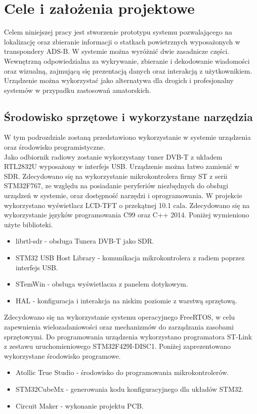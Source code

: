 \documentclass[eng,printmode]{mgr}
\begin{document}
\chapter{ Cele i założenia projektowe }
Celem niniejszej pracy jest stworzenie prototypu systemu pozwalającego na lokalizację oraz zbieranie informacji o  statkach powietrznych wyposażonych w transpondery ADS-B. W systemie można wyróżnić dwie zasadnicze części.
Wewnętrzną odpowiedzialna za wykrywanie, zbieranie i dekodowanie wiadomości oraz wizualną, zajmującą się prezentacją danych oraz interakcją z użytkownikiem. Urządzenie można wykorzystać jako alternatywa dla drogich i profesjonalny systemów w przypadku zastosowań amatorskich.

\section{Środowisko sprzętowe i wykorzystane narzędzia}
W tym podrozdziale zostaną przedstawiono wykorzystanie w systemie urządzenia oraz środowisko programistyczne.
\\
Jako odbiornik radiowy zostanie wykorzystany tuner DVB-T z układem RTL2832U wyposażony w interfejs USB. Urządzenie można łatwo zamienić w SDR. Zdecydowano się na wykorzystanie mikrokontrolera firmy ST z serii STM32F767, ze względu na posiadanie peryferiów niezbędnych do obsługi urządzeń w systemie, oraz dostępność narzędzi i oprogramowania. W projekcie wykorzystano wyświetlacz LCD-TFT o przekątnej 10.1 cala.
Zdecydowano się na wykorzystanie języków programowania C99 oraz C++ 2014.
Poniżej wymieniono użyte biblioteki.
\begin{itemize}
  \item librtl-sdr - obsługa Tunera DVB-T jako SDR.
  \item STM32 USB Host Library - komunikacja mikrokontrolera z radiem poprzez interfejs USB.
  \item STemWin - obsługa wyświetlacza z panelem dotykowym.
  \item HAL - konfiguracja i interakcja na niskim poziomie z warstwą sprzętową.
\end{itemize}


Zdecydowano się na wykorzystanie systemu operacyjnego FreeRTOS, w celu zapewnienia wielozadaniowości oraz mechanizmów do zarządzania zasobami sprzętowymi. Do programowania urządzenia wykorzystano programatora ST-Link z zestawu uruchomieniowego STM32F429I-DISC1. Poniżej zaprezentowano wykorzystane środowisko programowe.

\begin{itemize}
  \item Atollic True Studio - środowisko do programowania mikrokontrolerów.
  \item STM32CubeMx - generowania kodu konfiguracyjnego dla układów STM32.
  \item Circuit Maker - wykonanie projektu PCB.
\end{itemize}
\end{document}
